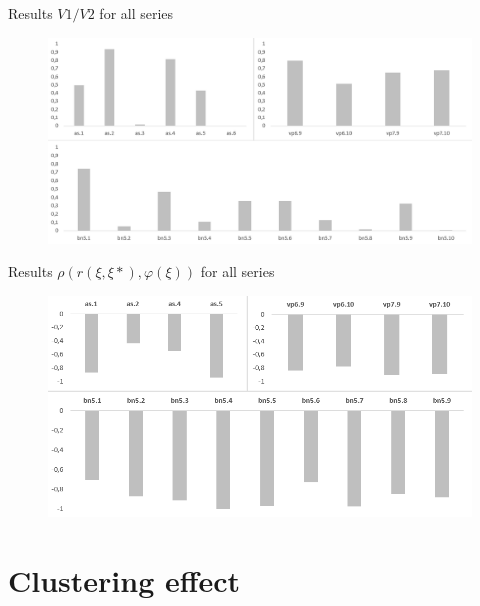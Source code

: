 \documentclass[aspectratio=169,xcolor=dvipsnames]{beamer}
\begin{document}

\begin{frame}{Results $V1/V2$ for all series}
    \begin{figure}
    \includegraphics[scale=0.6]{volume}
    \end{figure}
\end{frame}


\begin{frame}{Results $\rho(r(\xi, \xi*),\varphi(\xi))$ for all series}
    \begin{figure}
    \includegraphics[scale=0.8]{ro}
    \end{figure}
\end{frame}

\section{Clustering effect}
\end{document}
